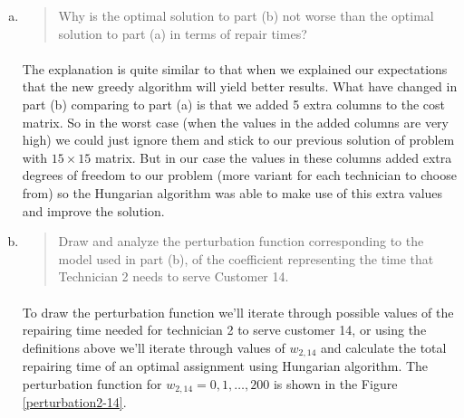 \begin{enumerate}[(a)]
\begin{enumerate}[1.]
\end{enumerate}

\item\begin{quote}Why is the optimal solution to part (b) not worse than the optimal solution to part
(a) in terms of repair times?\end{quote}

	\paragraph{}
	The explanation is quite similar to that when we explained our expectations that the new greedy algorithm will yield better results. What have changed in part (b) comparing to part (a) is that we added 5 extra columns to the cost matrix. So in the worst case (when the values in the added columns are very high) we could just ignore them and stick to our previous solution of problem with $15\times15$ matrix. But in our case the values in these columns added extra degrees of freedom to our problem (more variant for each technician to choose from) so the Hungarian algorithm was able to make use of this extra values and improve the solution.

\item\begin{quote}Draw and analyze the perturbation function corresponding to the model used in
part (b), of the coefficient representing the time that Technician 2 needs to serve
Customer 14.\end{quote}

	\paragraph{}
	To draw the perturbation function we'll iterate through possible values of the repairing time needed for technician 2 to serve customer 14, or using the definitions above we'll iterate through values of $w_{2,14}$ and calculate the total repairing time of an optimal assignment using Hungarian algorithm. The perturbation function for $w_{2,14}=0,1,\dots,200$ is shown in the Figure \ref{perturbation2-14}.


\end{enumerate}
